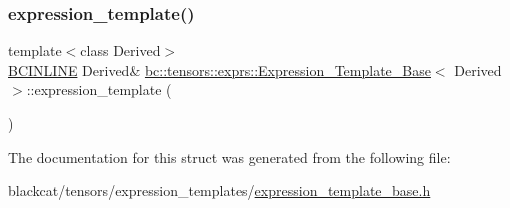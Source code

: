 \subsubsection{\texorpdfstring{expression\+\_\+template()}{expression\_template()}\hspace{0.1cm}{\footnotesize\ttfamily [2/2]}}
{\footnotesize\ttfamily template$<$class Derived$>$ \\
\hyperlink{common_8h_a6699e8b0449da5c0fafb878e59c1d4b1}{B\+C\+I\+N\+L\+I\+NE} Derived\& \hyperlink{structbc_1_1tensors_1_1exprs_1_1Expression__Template__Base}{bc\+::tensors\+::exprs\+::\+Expression\+\_\+\+Template\+\_\+\+Base}$<$ Derived $>$\+::expression\+\_\+template (\begin{DoxyParamCaption}{ }\end{DoxyParamCaption})\hspace{0.3cm}{\ttfamily [inline]}}



The documentation for this struct was generated from the following file\+:\begin{DoxyCompactItemize}
\item 
blackcat/tensors/expression\+\_\+templates/\hyperlink{expression__template__base_8h}{expression\+\_\+template\+\_\+base.\+h}\end{DoxyCompactItemize}

